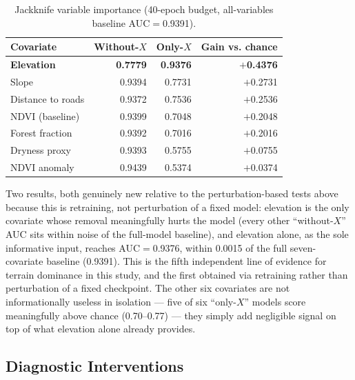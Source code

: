 \documentclass[journal]{IEEEtran}
\begin{document}
\begin{table}[t]
\centering
\caption{Jackknife variable importance (40-epoch budget, all-variables baseline AUC$=$0.9391).}
\label{tab:jackknife}
\begin{tabular}{lrrr}
\toprule
\textbf{Covariate} & \textbf{Without-$X$} & \textbf{Only-$X$} & \textbf{Gain vs. chance} \\
\midrule
\textbf{Elevation} & \textbf{0.7779} & \textbf{0.9376} & \textbf{$+$0.4376} \\
Slope & 0.9394 & 0.7731 & $+$0.2731 \\
Distance to roads & 0.9372 & 0.7536 & $+$0.2536 \\
NDVI (baseline) & 0.9399 & 0.7048 & $+$0.2048 \\
Forest fraction & 0.9392 & 0.7016 & $+$0.2016 \\
Dryness proxy & 0.9393 & 0.5755 & $+$0.0755 \\
NDVI anomaly & 0.9439 & 0.5374 & $+$0.0374 \\
\bottomrule
\end{tabular}
\end{table}

Two results, both genuinely new relative to the perturbation-based tests above because this is retraining, not perturbation of a fixed model: elevation is the only covariate whose removal meaningfully hurts the model (every other ``without-$X$'' AUC sits within noise of the full-model baseline), and elevation alone, as the sole informative input, reaches AUC$=$0.9376, within 0.0015 of the full seven-covariate baseline (0.9391). This is the fifth independent line of evidence for terrain dominance in this study, and the first obtained via retraining rather than perturbation of a fixed checkpoint. The other six covariates are not informationally useless in isolation --- five of six ``only-$X$'' models score meaningfully above chance (0.70--0.77) --- they simply add negligible signal on top of what elevation alone already provides.

\subsection{Diagnostic Interventions}
\end{document}
